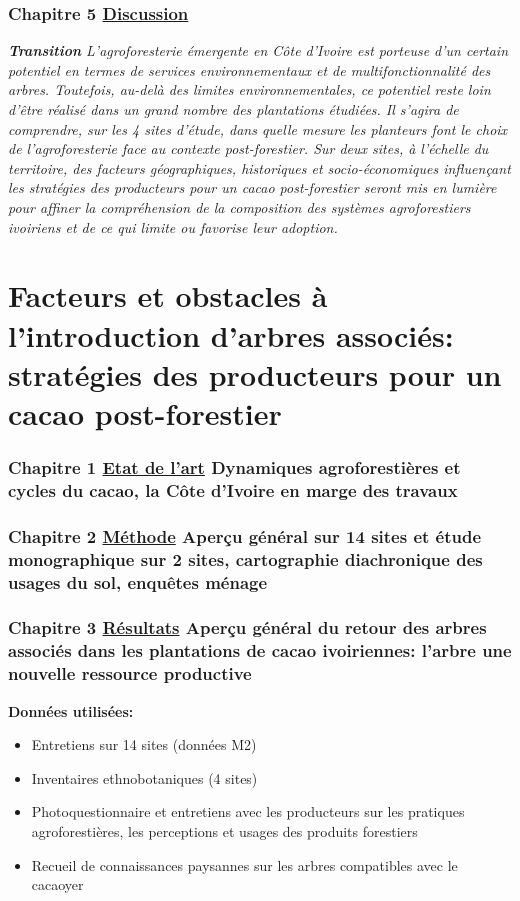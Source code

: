 \documentclass[a4paper,notitlepage]{article}
\begin{document}
\section* {Chapitre 5 \underline{Discussion}}
\vspace{1cm}

\textit{\textbf{Transition} L'agroforesterie émergente en Côte d'Ivoire est porteuse d'un certain potentiel en termes de services environnementaux et de multifonctionnalité des arbres. Toutefois, au-delà des limites environnementales, ce potentiel reste loin d'être réalisé dans un grand nombre des plantations étudiées. Il s'agira de comprendre, sur les 4 sites d'étude, dans quelle mesure les planteurs font le choix de l'agroforesterie face au contexte post-forestier. Sur deux sites, à l'échelle du territoire, des facteurs géographiques, historiques et socio-économiques influençant les stratégies des producteurs pour un cacao post-forestier seront mis en lumière pour affiner la compréhension de la composition des systèmes agroforestiers ivoiriens et de ce qui limite ou favorise leur adoption.}

\vspace{1cm}




\part{Facteurs et obstacles à l'introduction d'arbres associés: stratégies des producteurs pour un cacao post-forestier}
\vspace{1cm}
\setcounter{section}{0}
\section*{Chapitre 1 \underline{Etat de l'art} Dynamiques agroforestières et cycles du cacao, la Côte d'Ivoire en marge des travaux}

\section*{Chapitre 2 \underline{Méthode} Aperçu général sur 14 sites et étude monographique sur 2 sites, cartographie diachronique des usages du sol, enquêtes ménage}

\section*{Chapitre 3 \underline{Résultats} Aperçu général du retour des arbres associés dans les plantations de cacao ivoiriennes: l'arbre une nouvelle ressource productive}
\textbf{Données utilisées:}
\begin{itemize} 
\item{Entretiens sur 14 sites (données M2)}
\item{Inventaires ethnobotaniques (4 sites)}
\item{Photoquestionnaire et entretiens avec les producteurs sur les pratiques agroforestières, les perceptions et usages des produits forestiers}
\item{Recueil de connaissances paysannes sur les arbres compatibles avec le cacaoyer}
\end{itemize}
\end{document}
